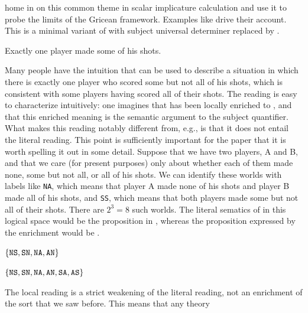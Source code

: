 \documentclass{article}
\begin{document}
\citet{Chemla:Spector:2011} home in on this common theme in scalar
implicature calculation and use it to probe the limits of the Gricean
framework. Examples like  drive their account.
This is a minimal variant of  with subject universal
determiner  replaced by .
%
\begin{examples}
\item\label{exactlyonesome} Exactly one player made some of his shots.
\end{examples}
%
Many people have the intuition that  can be used to
describe a situation in which there is exactly one player who scored
some but not all of his shots, which is consistent with some players
having scored all of their shots. The reading is easy to characterize
intuitively: one imagines that  has been
locally enriched to , and that
this enriched meaning is the semantic argument to the subject
quantifier. What makes this reading notably different from, e.g.,
 is that it does not entail the literal reading. This
point is sufficiently important for the paper that it is worth
spelling it out in some detail. Suppose that we have two players, A
and B, and that we care (for present purposes) only about whether each
of them made none, some but not all, or all of his shots. We can
identify these worlds with labels like \texttt{NA}, which means that
player A made none of his shots and player B made all of his shots,
and \texttt{SS}, which means that both players made some but not all
of their shots. There are $2^{3} = 8$ such worlds. The literal
sematics of  in this logical space would be the
proposition in , whereas the
proposition expressed by the enrichment  would be .
%
\begin{examples}
\item\label{exactlyonesome-sem}
  \begin{examples}
  \item\label{lit}   $\left\{ \texttt{NS}, \texttt{SN}, \texttt{NA}, \texttt{AN} \right\}$
  \item\label{local} $\left\{ \texttt{NS}, \texttt{SN}, \texttt{NA}, \texttt{AN}, \texttt{SA}, \texttt{AS} \right\}$
  \end{examples}  
\end{examples}
%
The local reading is a strict weakening of the literal reading, not an
enrichment of the sort that we saw before. This means that any theory
\end{document}
